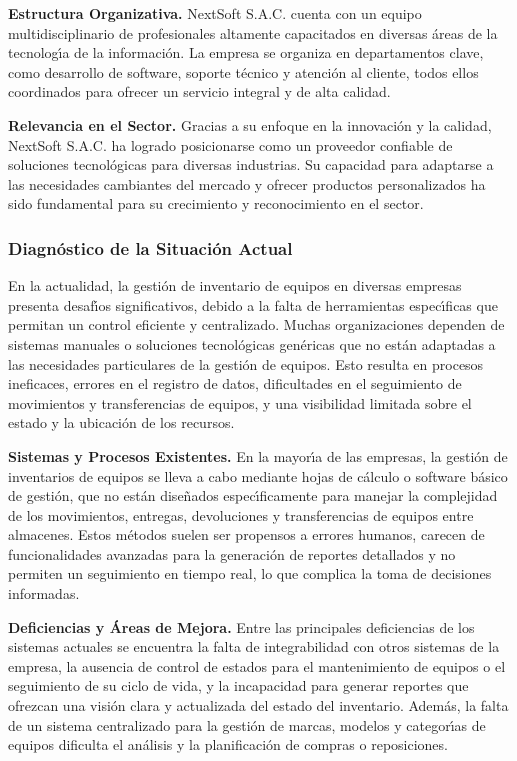 \documentclass[stu, 12pt, letterpaper, donotrepeattitle, floatsintext, natbib]{apa7}
\begin{document}
\textbf{Estructura Organizativa. }NextSoft S.A.C. cuenta con un equipo multidisciplinario de profesionales altamente capacitados en diversas \'areas de la tecnolog\'{\i}a de la informaci\'on. La empresa se organiza en
departamentos clave, como desarrollo de software, soporte t\'ecnico y atención al cliente, todos ellos coordinados para ofrecer un servicio integral y de alta calidad.

\textbf{Relevancia en el Sector. }Gracias a su enfoque en la innovaci\'on y la calidad, NextSoft S.A.C. ha logrado posicionarse como un proveedor confiable de soluciones tecnol\'ogicas para diversas industrias. Su capacidad
para adaptarse a las necesidades cambiantes del mercado y ofrecer productos personalizados ha sido fundamental para su crecimiento y reconocimiento en el sector.

\subsubsection{Diagn\'ostico de la Situaci\'on Actual}
En la actualidad, la gesti\'on de inventario de equipos en diversas empresas presenta desaf\'{\i}os significativos, debido a la falta de herramientas espec\'{\i}ficas que permitan un control eficiente y centralizado. Muchas
organizaciones dependen de sistemas manuales o soluciones tecnol\'ogicas gen\'ericas que no est\'an adaptadas a las necesidades particulares de la gesti\'on de equipos. Esto resulta en procesos ineficaces, errores en el
registro de datos, dificultades en el seguimiento de movimientos y transferencias de equipos, y una visibilidad limitada sobre el estado y la ubicaci\'on de los recursos.

\textbf{Sistemas y Procesos Existentes. }En la mayor\'{\i}a de las empresas, la gesti\'on de inventarios de equipos se lleva a cabo mediante hojas de c\'alculo o software b\'asico de gesti\'on, que no est\'an dise\~{n}ados
espec\'{\i}ficamente para manejar la complejidad de los movimientos, entregas, devoluciones y transferencias de equipos entre almacenes. Estos m\'etodos suelen ser propensos a errores humanos, carecen de funcionalidades
avanzadas para la generaci\'on de reportes detallados y no permiten un seguimiento en tiempo real, lo que complica la toma de decisiones informadas.

\textbf{Deficiencias y \'Areas de Mejora. }Entre las principales deficiencias de los sistemas actuales se encuentra la falta de integrabilidad con otros sistemas de la empresa, la ausencia de control de estados para el
mantenimiento de equipos o el seguimiento de su ciclo de vida, y la incapacidad para generar reportes que ofrezcan una visi\'on clara y actualizada del estado del inventario. Adem\'as, la falta de un sistema centralizado
para la gesti\'on de marcas, modelos y categor\'{\i}as de equipos dificulta el an\'alisis y la planificaci\'on de compras o reposiciones.
\end{document}
